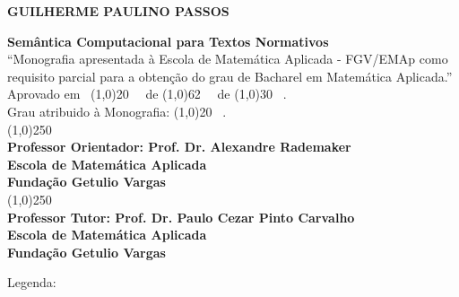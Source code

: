 \documentclass[12pt, a4paper, twoside]{article}
\newcommand{\fixed}[1]{\todo[color=Green]{#1}}
\theoremstyle{definition}
\newcommand{\supervisor}{Alexandre Rademaker}
\begin{document}
\begin{titlepage}
 \begin{center}
 
  {\bf \large \uppercase{Guilherme Paulino Passos}}\\[0.3cm]

  \vspace{25 mm}

  {\bf \large Semântica Computacional para Textos Normativos}\\[3cm]

  {“Monografia apresentada à Escola de Matemática Aplicada  - FGV/EMAp como requisito parcial para a obtenção do grau de Bacharel em Matemática Aplicada.”}\\[3cm]


  {Aprovado em \ \line(1,0){20} \ \ de \line(1,0){62} \ \ de \line(1,0){30} \ .}\\[0.1cm]
  {Grau atribuido à Monografia: \line(1,0){20} \ . }\\[3cm]
  
  
  {\line(1,0){250}}\\
  {\bf Professor Orientador: Prof. Dr. \supervisor}\\[0.1cm]
  {\bf Escola de Matemática Aplicada}\\[0.1cm]
  {\bf Fundação Getulio Vargas}\\[1.5cm]
  
    {\line(1,0){250}}\\
    {\bf Professor Tutor: Prof. Dr. Paulo Cezar Pinto Carvalho}\\[0.1cm]
    {\bf Escola de Matemática Aplicada}\\[0.1cm]
    {\bf Fundação Getulio Vargas}
 \end{center}
\end{titlepage}

\newpage\null\thispagestyle{empty}\newpage


\tableofcontents

\newpage

Legenda:
\fixed{fixed}
\listoftodos

\end{document}
